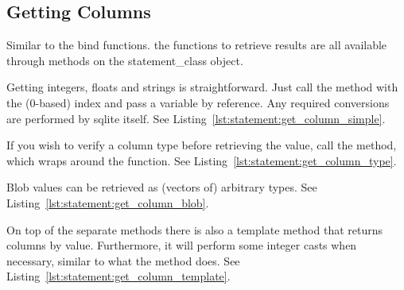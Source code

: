 \subsection{Getting Columns}
\label{section:statement:get}

Similar to the bind functions. the  functions to retrieve results are all available through methods on the \gls{statement_class} object.

Getting integers, floats and strings is straightforward. Just call the  method with the (0-based) index and pass a variable by reference. Any required conversions are performed by \gls{sqlite} itself. See Listing~\ref{lst:statement:get_column_simple}.



If you wish to verify a column type before retrieving the value, call the  method, which wraps around the  function. See Listing~\ref{lst:statement:get_column_type}.



Blob values can be retrieved as (vectors of) arbitrary types. See Listing~\ref{lst:statement:get_column_blob}. %



On top of the separate methods there is also a template method that returns columns by value. Furthermore, it will perform some integer casts when necessary, similar to what the  method does. See Listing~\ref{lst:statement:get_column_template}.

